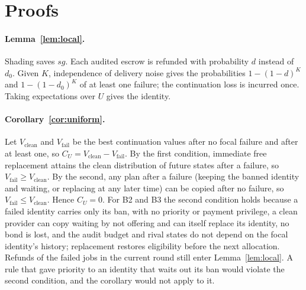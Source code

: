 \documentclass[11pt]{article}
\begin{document}
\begin{table}[h]\centering\small
{}
\caption{Development comparator selection (before the lock; development records): each credibility configuration's selected D2+H3 attack gain and gross efficiency at the inner search budget, and the two configurations rechecked at full budget, at the headline market and dev0, with R3's pacing and the fixed pair. Score: the development objective, the minimum over markets and families of the smaller of an efficiency margin and a gain margin, with the market and family that decide it; the efficiency margin was the smaller at every configuration.}\label{tab:comparator-dev}
\end{table}

\section{Proofs}\label{sec:app-proofs}\label{app:proofs}
\paragraph{Lemma~\ref{lem:local}.} Shading saves $sg$. Each audited escrow is refunded with probability $d$ instead of $d_0$. Given $K$, independence of delivery noise gives the probabilities $1 - (1-d)^K$ and $1 - (1-d_0)^K$ of at least one failure; the continuation loss is incurred once. Taking expectations over $U$ gives the identity.

\paragraph{Corollary~\ref{cor:uniform}.} Let $V_{\mathrm{clean}}$ and $V_{\mathrm{fail}}$ be the best continuation values after no focal failure and after at least one, so $C_U = V_{\mathrm{clean}} - V_{\mathrm{fail}}$. By the first condition, immediate free replacement attains the clean distribution of future states after a failure, so $V_{\mathrm{fail}} \ge V_{\mathrm{clean}}$. By the second, any plan after a failure (keeping the banned identity and waiting, or replacing at any later time) can be copied after no failure, so $V_{\mathrm{fail}} \le V_{\mathrm{clean}}$. Hence $C_U = 0$. For B2 and B3 the second condition holds because a failed identity carries only its ban, with no priority or payment privilege, a clean provider can copy waiting by not offering and can itself replace its identity, no bond is lost, and the audit budget and rival states do not depend on the focal identity's history; replacement restores eligibility before the next allocation. Refunds of the failed jobs in the current round still enter Lemma~\ref{lem:local}. A rule that gave priority to an identity that waits out its ban would violate the second condition, and the corollary would not apply to it.
\end{document}
